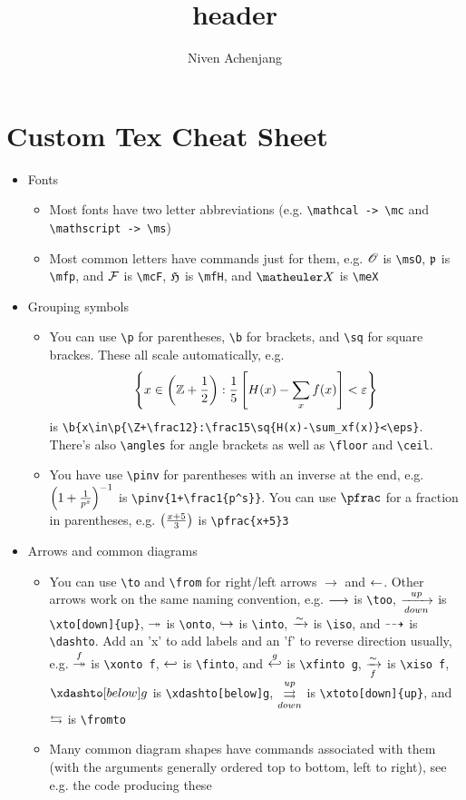 \documentclass{article}
\title{header}
\author{Niven Achenjang}
\numberwithin{thm}{section}
\numberwithin{prob}{section}
\numberwithin{equation}{section}
\begin{document}
\section{Custom Tex Cheat Sheet}

\begin{itemize}
    \item Fonts
    \begin{itemize}
        \item Most fonts have two letter abbreviations (e.g. \verb+\mathcal -> \mc+ and \verb+\mathscript -> \ms+)
        \item Most common letters have commands just for them, e.g. $\msO$ is \verb+\msO+, $\mfp$ is \verb+\mfp+, and $\mcF$ is \verb+\mcF+, $\mfH$ is \verb+\mfH+, and $\meX$ is \verb+\meX+
    \end{itemize}
    \item Grouping symbols
    \begin{itemize}
        \item You can use \verb+\p+ for parentheses, \verb+\b+ for brackets, and \verb+\sq+ for square brackes. These all scale automatically, e.g.
        $$\b{x\in\p{\Z+\frac12}:\frac15\sq{H(x)-\sum_xf(x)}<\eps}$$
        is \verb|\b{x\in\p{\Z+\frac12}:\frac15\sq{H(x)-\sum_xf(x)}<\eps}|. There's also \verb+\angles+ for angle brackets as well as \verb+\floor+ and \verb+\ceil+.
        \item You have use \verb+\pinv+ for parentheses with an inverse at the end, e.g. $\pinv{1+\frac1{p^s}}$ is \verb|\pinv{1+\frac1{p^s}}|. You can use $\verb+\pfrac+$ for a fraction in parentheses, e.g. $\pfrac{x+5}3$ is \verb|\pfrac{x+5}3|
    \end{itemize}
    \item Arrows and common diagrams
    \begin{itemize}
        \item You can use \verb+\to+ and \verb+\from+ for right/left arrows $\to$ and $\from$. Other arrows work on the same naming convention, e.g. $\too$ is \verb+\too+, $\xto[down]{up}$ is \verb+\xto[down]{up}+, $\onto$ is \verb+\onto+, $\into$ is \verb+\into+, $\iso$ is \verb+\iso+, and $\dashto$ is \verb+\dashto+. Add an 'x' to add labels and an 'f' to reverse direction usually, e.g. $\xonto f$ is \verb+\xonto f+, $\finto$ is \verb+\finto+, and $\xfinto g$ is \verb+\xfinto g+, $\xiso f$ is \verb+\xiso f+, $\xdashto[below]g$ is \verb+\xdashto[below]g+, $\xtoto[down]{up}$ is \verb+\xtoto[down]{up}+, and $\fromto$ is \verb+\fromto+
        \item Many common diagram shapes have commands associated with them (with the arguments generally ordered top to bottom, left to right), see e.g. the code producing these

\end{itemize}
\end{itemize}
\end{document}
